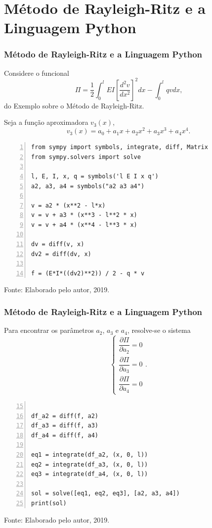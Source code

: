 \documentclass{beamer}
\newcommand{\fonte}[1]{
	\begin{center}
		\footnotesize Fonte: #1
	\end{center}
}
\newcommand{\fonteElaboradoPeloAutor}{
	\fonte{Elaborado pelo autor, 2019.}
}
\begin{document}
	\section{Método de Rayleigh-Ritz e a Linguagem Python}

	\begin{frame}
		\frametitle{Método de Rayleigh-Ritz e a Linguagem Python}
		\justify
		
		Considere o funcional
		$$
			\Pi = 
			\frac{1}{2} \int_0^l EI \left [
				\frac{d^2v}{dx^2}
			\right ]^2 dx
			-
			\int_0^l qvdx
			\text{,}
		$$
		do Exemplo sobre o Método de Rayleigh-Ritz.
		\vspace{10pt}
		\pause
		
		Seja a função aproximadora $v_3(x)$,
		$$
			v_3(x)=a_0 + a_1 x + a_2 x^2 + a_3 x^3 + a_4 x^4
			\text{.}
		$$
	\end{frame}
	
	\begin{frame}[containsverbatim]
		\begin{lstlisting}[style=Python,numbers=left, caption={Definição da Função Aproximadora e Integrando}, captionpos=t]
from sympy import symbols, integrate, diff, Matrix
from sympy.solvers import solve

l, E, I, x, q = symbols('l E I x q')
a2, a3, a4 = symbols("a2 a3 a4")

v = a2 * (x**2 - l*x) 
v = v + a3 * (x**3 - l**2 * x)
v = v + a4 * (x**4 - l**3 * x)

dv = diff(v, x)
dv2 = diff(dv, x)

f = (E*I*((dv2)**2)) / 2 - q * v
		\end{lstlisting}
		\fonteElaboradoPeloAutor
	\end{frame}
	
	\begin{frame}
		\frametitle{Método de Rayleigh-Ritz e a Linguagem Python}
		\justify
		
		Para encontrar os parâmetros $a_2$, $a_3$ e $a_4$, resolve-se o sistema
		$$
			\begin{cases}
				\dfrac{\partial \Pi}{\partial a_2}=0\\[10pt]
				\dfrac{\partial \Pi}{\partial a_3}=0\\[10pt]
				\dfrac{\partial \Pi}{\partial a_4}=0
			\end{cases}
			\text{.}
		$$
	\end{frame}
	
	\begin{frame}[containsverbatim]
		\begin{lstlisting}[style=Python, numbers=left, firstnumber=15, caption={Resolvendo o Sistema de Equações}, captionpos=t]

df_a2 = diff(f, a2)
df_a3 = diff(f, a3)
df_a4 = diff(f, a4)

eq1 = integrate(df_a2, (x, 0, l))
eq2 = integrate(df_a3, (x, 0, l))
eq3 = integrate(df_a4, (x, 0, l))

sol = solve([eq1, eq2, eq3], [a2, a3, a4])
print(sol)
		\end{lstlisting}
		\fonteElaboradoPeloAutor
	\end{frame}
	
\end{document}
